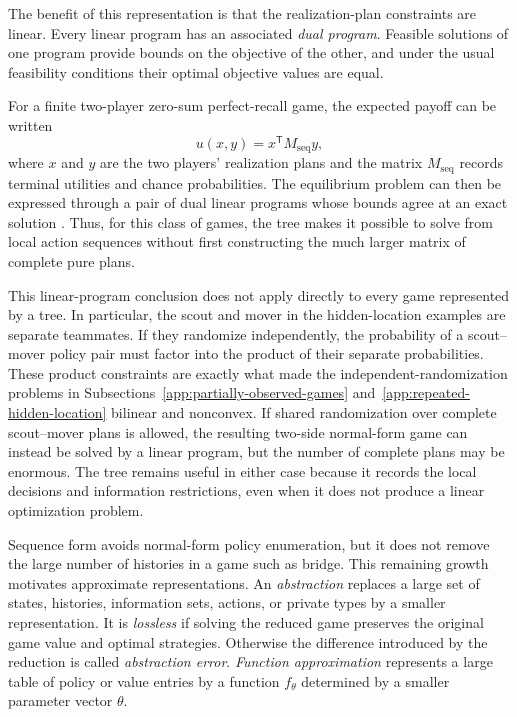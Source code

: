 The benefit of this representation is that the realization-plan constraints are linear. Every linear program has an associated \emph{dual program}. Feasible solutions of one program provide bounds on the objective of the other, and under the usual feasibility conditions their optimal objective values are equal.

For a finite two-player zero-sum perfect-recall game, the expected payoff can be written
\[
    u(x,y)=x^{\mathsf T}M_{\mathrm{seq}}y,
\]
where $x$ and $y$ are the two players' realization plans and the matrix $M_{\mathrm{seq}}$ records terminal utilities and chance probabilities. The equilibrium problem can then be expressed through a pair of dual linear programs whose bounds agree at an exact solution \cite{koller1996sequence}. Thus, for this class of games, the tree makes it possible to solve from local action sequences without first constructing the much larger matrix of complete pure plans.

This linear-program conclusion does not apply directly to every game represented by a tree. In particular, the scout and mover in the hidden-location examples are separate teammates. If they randomize independently, the probability of a scout--mover policy pair must factor into the product of their separate probabilities. These product constraints are exactly what made the independent-randomization problems in Subsections~\ref{app:partially-observed-games} and~\ref{app:repeated-hidden-location} bilinear and nonconvex. If shared randomization over complete scout--mover plans is allowed, the resulting two-side normal-form game can instead be solved by a linear program, but the number of complete plans may be enormous. The tree remains useful in either case because it records the local decisions and information restrictions, even when it does not produce a linear optimization problem.

Sequence form avoids normal-form policy enumeration, but it does not remove the large number of histories in a game such as bridge. This remaining growth motivates approximate representations. An \emph{abstraction} replaces a large set of states, histories, information sets, actions, or private types by a smaller representation. It is \emph{lossless} if solving the reduced game preserves the original game value and optimal strategies. Otherwise the difference introduced by the reduction is called \emph{abstraction error}. \emph{Function approximation} represents a large table of policy or value entries by a function $f_\theta$ determined by a smaller parameter vector $\theta$.


